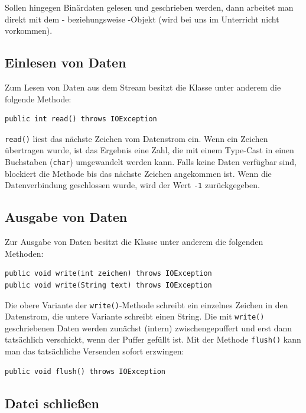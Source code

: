 Sollen hingegen Binärdaten gelesen und geschrieben werden, dann arbeitet man
direkt mit dem - beziehungsweise
-Objekt (wird bei uns im Unterricht nicht vorkommen).

\subsection{Einlesen von Daten}

Zum Lesen von Daten aus dem Stream besitzt die Klasse
 unter anderem die folgende Methode:

\begin{lstlisting}
public int read() throws IOException
\end{lstlisting}

\lstinline|read()| liest das nächste Zeichen vom Datenstrom ein. Wenn ein
Zeichen übertragen wurde, ist das Ergebnis eine Zahl, die mit einem Type-Cast
in einen Buchstaben (\lstinline|char|) umgewandelt werden kann. Falls keine
Daten verfügbar sind, blockiert die Methode bis das nächste Zeichen angekommen
ist. Wenn die Datenverbindung geschlossen wurde, wird der Wert \lstinline|-1|
zurückgegeben.

\subsection{Ausgabe von Daten}

Zur Ausgabe von Daten besitzt die Klasse  unter
anderem die folgenden Methoden:

\begin{lstlisting}
public void write(int zeichen) throws IOException
public void write(String text) throws IOException
\end{lstlisting}

Die obere Variante der \lstinline|write()|-Methode schreibt ein einzelnes
Zeichen in den Datenstrom, die untere Variante schreibt einen String. Die mit
\lstinline|write()| geschriebenen Daten werden zunächst (intern)
zwischengepuffert und erst dann tatsächlich verschickt, wenn der Puffer gefüllt
ist. Mit der Methode \lstinline|flush()| kann man das tatsächliche Versenden
sofort erzwingen:

\begin{lstlisting}
public void flush() throws IOException
\end{lstlisting}

\subsection{Datei schließen}

